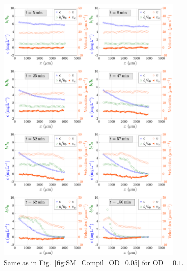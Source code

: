 \documentclass[aps,a4paper,twocolumn,10pt,pre,showpacs]{revtex4-2}
\begin{document}
\begin{figure}[ht]
\includegraphics[trim = 0mm 0mm 0mm 0mm, clip, width=0.8\textwidth, angle=0]{FigAE_02.pdf}
\caption{Same as in Fig.~\ref{fig:SM_Compil_OD=0.05} for $\mathrm{OD}=0.1$.}  
\label{fig:SM_Compil_OD=0.1}
\end{figure}
\end{document}
